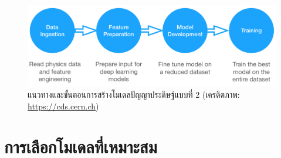 \begin{figure}[H]
    \centering
    \includegraphics[width=\linewidth]{fig/ml_pipeline.png}
    \caption{แนวทางและขั้นตอนการสร้างโมเดลปัญญาประดิษฐ์แบบที่ 2 (เครดิตภาพ: \url{https://cds.cern.ch})}
    \label{fig:ml_pipeline}
\end{figure}

\section{การเลือกโมเดลที่เหมาะสม}
\label{sec:choose_ml_model}


